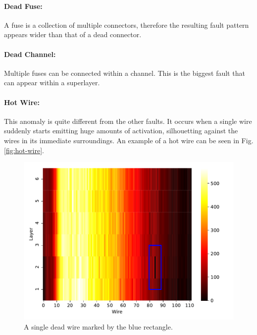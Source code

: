 \paragraph{Dead Fuse:}
A fuse is a collection of multiple
connectors, therefore the resulting fault pattern appears wider
than that of a dead connector.

\paragraph{Dead Channel:}
Multiple fuses can be connected within
a channel. This is the biggest fault that can appear within a
superlayer.

\paragraph{Hot Wire:}
This anomaly is quite different from the other faults. It occurs when
a single wire suddenly starts emitting huge amounts of activation,
silhouetting against the wires in its immediate surroundings. An
example of a hot wire can be seen in Fig. \ref{fig:hot-wire}.

\begin{figure}[h]
  \centering
  \includegraphics[width=\textwidth]{../figures/dead_wire}
  \caption{A single dead wire marked by the blue rectangle.}
  \label{fig:dead-wire}
\end{figure}

